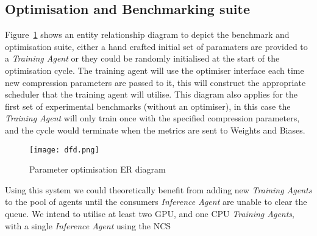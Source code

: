 \documentclass[../../D1.tex]{subfiles}
\begin{document}
\subsection{Optimisation and Benchmarking suite}\label{sec:ERdiagram}

Figure~\ref{fig:benchcycle} shows an entity relationship diagram to depict the benchmark and optimisation suite, either a hand crafted initial set of paramaters are provided to a \emph{Training Agent} or they could be randomly initialised at the start of the optimisation cycle.
The training agent will use the optimiser interface each time new compression parameters are passed to it, this will construct the appropriate scheduler that the training agent will utilise.
This diagram also applies for the first set of experimental benchmarks (without an optimiser), in this case the \emph{Training Agent} will only train once with the specified compression parameters, and the cycle would terminate when the metrics are sent to Weights and Biases.

\begin{figure}[H]
    \texttt{[image: dfd.png]}
    \caption{Parameter optimisation ER diagram}
    \label{fig:benchcycle}
\end{figure}

Using this system we could theoretically benefit from adding new \emph{Training Agents} to the pool of agents until the consumers \emph{Inference Agent} are unable to clear the queue.
We intend to utilise at least two GPU, and one CPU \emph{Training Agents}, with a single \emph{Inference Agent} using the NCS
\end{document}
